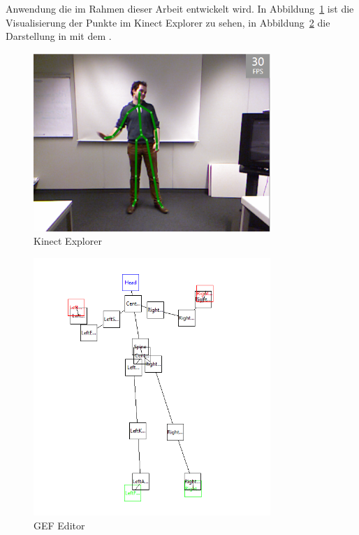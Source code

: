 Anwendung die im Rahmen dieser Arbeit entwickelt wird. In Abbildung~\ref{fig:kinectexplorer} ist die Visualisierung der Punkte im Kinect Explorer zu sehen, 
in Abbildung~\ref{fig:gef} die Darstellung in mit dem .
\par\smallskip 
\begin{figure}[htb]
\centering
\includegraphics[width=0.8\textwidth]{img/04kapitel/kinectexplorer.png}
\caption[Kinect Explorer]{Kinect Explorer\footnotemark[4]}
\label{fig:kinectexplorer}
\end{figure}
\begin{figure}[!]
\centering
\includegraphics[width=0.8\textwidth]{img/04kapitel//gefeditor.png}
\caption[GEF Editor]{GEF Editor}
\label{fig:gef}
\end{figure}
